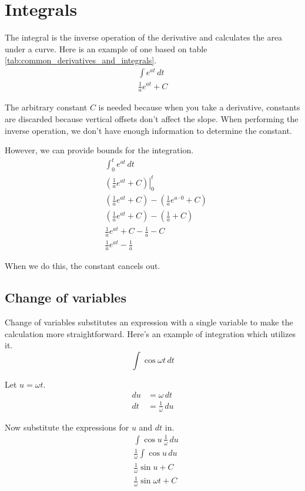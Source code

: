 \section{Integrals}

The integral is the inverse operation of the derivative and calculates the area
under a curve. Here is an example of one based on table
\ref{tab:common_derivatives_and_integrals}.
\begin{align*}
  \int e^{at} \,dt \\
  \frac{1}{a}e^{at} + C
\end{align*}

The arbitrary constant $C$ is needed because when you take a derivative,
constants are discarded because vertical offsets don't affect the slope. When
performing the inverse operation, we don't have enough information to determine
the constant.

However, we can provide bounds for the integration.
\begin{align*}
  &\int_0^t e^{at} \,dt \\
  &\left.\left(\frac{1}{a}e^{at} + C\right)\right\vert_0^t \\
  &\left(\frac{1}{a}e^{at} + C\right) -
    \left(\frac{1}{a}e^{a \cdot 0} + C\right) \\
  &\left(\frac{1}{a}e^{at} + C\right) - \left(\frac{1}{a} + C\right) \\
  &\frac{1}{a}e^{at} + C - \frac{1}{a} - C \\
  &\frac{1}{a}e^{at} - \frac{1}{a}
\end{align*}

When we do this, the constant cancels out.

\subsection{Change of variables}
\label{subsec:calculus_change_of_vars}

Change of variables substitutes an expression with a single variable to make the
calculation more straightforward. Here's an example of integration which
utilizes it.
\begin{equation*}
  \int \cos\omega t \,dt
\end{equation*}

Let $u = \omega t$.
\begin{align*}
  du &= \omega \,dt \\
  dt &= \frac{1}{\omega} \,du
\end{align*}

Now substitute the expressions for $u$ and $dt$ in.
\begin{align*}
  &\int \cos u \,\frac{1}{\omega} \,du \\
  &\frac{1}{\omega} \int \cos u \,du \\
  &\frac{1}{\omega} \sin u + C \\
  &\frac{1}{\omega} \sin\omega t + C
\end{align*}
